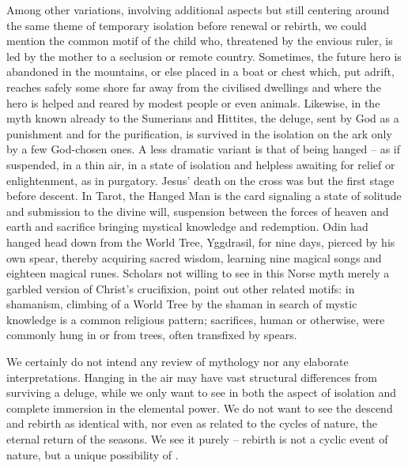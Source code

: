 Among other variations, involving additional aspects but still centering around
the same theme of temporary isolation before renewal or rebirth, we could
mention the common motif of the child who, threatened by the envious ruler, is
led by the mother to a seclusion or remote country. Sometimes, the future hero is abandoned in the mountains, or else placed in a boat or chest which, put adrift, reaches
safely some shore far away from the civilised dwellings and where the hero is
helped and reared by modest people or even animals.  Likewise, in the myth known already to the Sumerians and Hittites,
the deluge, sent by God as a punishment and for the purification, is survived in
the isolation on the ark only by a few God-chosen ones.  A less dramatic variant is that of being
hanged -- as if suspended, in a thin air, in a state of isolation and helpless
awaiting for relief or enlightenment, as in purgatory. Jesus' death on the cross
was but the first stage before descent.  In Tarot, the Hanged Man is the card
signaling a state of solitude and submission to the divine will, suspension between
the forces of heaven and earth and sacrifice bringing mystical knowledge and
redemption.  Odin had hanged head down from the World Tree, Yggdrasil, for nine
days, pierced by his own spear, thereby acquiring sacred wisdom, learning nine
magical songs and eighteen magical runes.  Scholars not willing to see in this
Norse myth merely a garbled version of Christ's crucifixion, point out other
related motifs: in shamanism, climbing of a World Tree by the shaman in search
of mystic knowledge is a common religious pattern; sacrifices, human or
otherwise, were commonly hung in or from trees, often transfixed by
spears.

\pa
We certainly do not intend any review of mythology nor any elaborate
interpretations.  Hanging in the air may have vast structural differences from
surviving a deluge, while we only want to see in both the aspect of isolation
and complete immersion in the elemental power. 
We do not want to see the descend and rebirth as identical with, nor even as
related to the cycles of nature, the eternal return of the seasons. 
We see it purely  -- rebirth
is not a cyclic event of nature, but a unique possibility of .

